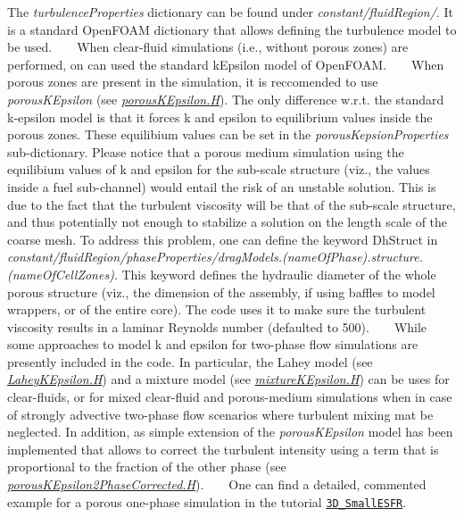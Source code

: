 The {\itshape turbulence\+Properties} dictionary can be found under {\itshape constant/fluid\+Region/}. It is a standard Open\+F\+O\+AM dictionary that allows defining the turbulence model to be used. ~\newline
~\newline
When clear-\/fluid simulations (i.\+e., without porous zones) are performed, on can used the standard k\+Epsilon model of Open\+F\+O\+AM. ~\newline
~\newline
When porous zones are present in the simulation, it is reccomended to use {\itshape porous\+K\+Epsilon} (see {\itshape \hyperlink{porousKEpsilon_8H}{porous\+K\+Epsilon.\+H}}). The only difference w.\+r.\+t. the standard k-\/epsilon model is that it forces k and epsilon to equilibrium values inside the porous zones. These equilibium values can be set in the {\itshape porous\+Kepsion\+Properties} sub-\/dictionary. Please notice that a porous medium simulation using the equilibium values of k and epsilon for the sub-\/scale structure (viz., the values inside a fuel sub-\/channel) would entail the risk of an unstable solution. This is due to the fact that the turbulent viscosity will be that of the sub-\/scale structure, and thus potentially not enough to stabilize a solution on the length scale of the coarse mesh. To address this problem, one can define the keyword Dh\+Struct in {\itshape constant/fluid\+Region/phase\+Properties/drag\+Models.(name\+Of\+Phase).structure.(name\+Of\+Cell\+Zones)}. This keyword defines the hydraulic diameter of the whole porous structure (viz., the dimension of the assembly, if using baffles to model wrappers, or of the entire core). The code uses it to make sure the turbulent viscosity results in a laminar Reynolds number (defaulted to 500). ~\newline
~\newline
While some approaches to model k and epsilon for two-\/phase flow simulations are presently included in the code. In particular, the Lahey model (see {\itshape \hyperlink{LaheyKEpsilon_8H}{Lahey\+K\+Epsilon.\+H}}) and a mixture model (see {\itshape \hyperlink{mixtureKEpsilon_8H}{mixture\+K\+Epsilon.\+H}}) can be uses for clear-\/fluids, or for mixed clear-\/fluid and porous-\/medium simulations when in case of strongly advective two-\/phase flow scenarios where turbulent mixing mat be neglected. In addition, as simple extension of the {\itshape porous\+K\+Epsilon} model has been implemented that allows to correct the turbulent intensity using a term that is proportional to the fraction of the other phase (see {\itshape \hyperlink{porousKEpsilon2PhaseCorrected_8H}{porous\+K\+Epsilon2\+Phase\+Corrected.\+H}}). ~\newline
~\newline
One can find a detailed, commented example for a porous one-\/phase simulation in the tutorial \href{https://gitlab.com/foam-for-nuclear/GeN-Foam/-/tree/master/Tutorials/3D_SmallESFR/rootCase/constant/fluidRegion/turbulenceProperties}{\tt 3\+D\+\_\+\+Small\+E\+S\+FR}.  ~\newline


